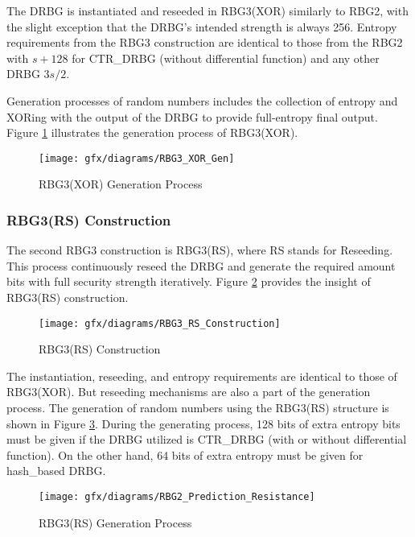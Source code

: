 The DRBG is instantiated and reseeded in RBG3(XOR) similarly to RBG2, with the slight exception that the DRBG's intended strength is always 256. Entropy requirements from the RBG3 construction are identical to those from the RBG2 with $s+128$ for CTR\_DRBG (without differential function) and any other DRBG $3s/2$.

Generation processes of random numbers includes the collection of entropy and XORing with the output of the DRBG to provide full-entropy final output. Figure \ref{fig:3:6} illustrates the generation process of RBG3(XOR).
\begin{figure}[htbp]
	\centering
	\texttt{[image: gfx/diagrams/RBG3\_XOR\_Gen]}
	\caption{RBG3(XOR) Generation Process}
	\label{fig:3:6}
\end{figure}

%
%
\subsubsection{RBG3(RS) Construction}
\label{subsubsec:SoA:RBG3:RS}
The second RBG3 construction is RBG3(RS), where RS stands for Reseeding. This process continuously reseed the DRBG and generate the required amount bits with full security strength iteratively. Figure \ref{fig:3:7} provides the insight of RBG3(RS) construction.
\begin{figure}[htbp]
	\centering
	\texttt{[image: gfx/diagrams/RBG3\_RS\_Construction]}
	\caption{RBG3(RS) Construction}
	\label{fig:3:7}
\end{figure}

The instantiation, reseeding, and entropy requirements are identical to those of RBG3(XOR). But reseeding mechanisms are also a part of the generation process. The generation of random numbers using the RBG3(RS) structure is shown in Figure \ref{fig:3:8}. During the generating process, 128 bits of extra entropy bits must be given if the DRBG utilized is CTR\_DRBG (with or without differential function). On the other hand, 64 bits of extra entropy must be given for hash\_based DRBG.
\begin{figure}[htbp]
	\centering
	\texttt{[image: gfx/diagrams/RBG2\_Prediction\_Resistance]}
	\caption{RBG3(RS) Generation Process}
	\label{fig:3:8}
\end{figure}

%
%

